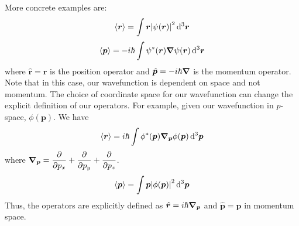 \documentclass[oneside]{book}
\numberwithin{figure}{section}
\numberwithin{equation}{section}
\newcommand{\dpdv}{\displaystyle\pdv}
\theoremstyle{definition}
\begin{document}
	More concrete examples are:
	\begin{equation}
		\expval{\bm{r}} = \int\bm{r}\abs{\psi(\bm{r})}^2\dd[3]{\bm{r}}
	\end{equation}
	\begin{equation}
		\expval{\bm{p}} = -i\hbar\int\psi^*(\bm{r})\grad{\psi(\bm{r})}\dd[3]{\bm{r}}
	\end{equation}
	where $ \hat{\bm{r}} = \bm{r} $ is the position operator and $ \hat{\bm{p}} = -i\hbar\grad $ is the momentum operator. Note that in this case, our wavefunction is dependent on space and not momentum. The choice of coordinate space for our wavefunction can change the explicit definition of our operators. For example, given our wavefunction in $ p $-space, $ \phi(\bm{p}) $. We have
	\begin{equation}
		\expval{\bm{r}} = i\hbar\int\phi^*(\bm{p})\grad{}_{\bm{p}}\phi(\bm{p})\dd[3]{\bm{p}}
	\end{equation}
	where $ \grad{}_{\bm{p}} = \dpdv{p_x} + \dpdv{p_y} + \dpdv{p_z} $.
	\begin{equation}
		\expval{\bm{p}} = \int\bm{p}\abs{\phi(\bm{p})}^2\dd[3]{\bm{p}}
	\end{equation}
	Thus, the operators are explicitly defined as $ \hat{\bm{r}} = i\hbar\grad{}_{\bm{p}} $ and $ \hat{\bm{p}} = \bm{p} $ in momentum space.
	
\end{document}
